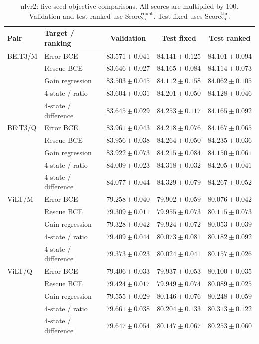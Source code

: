\begin{table}[H]\centering
\caption{nlvr2: five-seed objective comparisons. All scores are multiplied by 100. Validation and test ranked use $\mathrm{Score}_{25}^{\mathrm{count}}$. Test fixed uses $\mathrm{Score}_{25}^{\mathrm{thr}}$.}
\fontsize{7.5}{9}\selectfont
\setlength{\tabcolsep}{3pt}
\begin{tabular}{llccc}\toprule
Pair & Target / ranking & Validation & Test fixed & Test ranked \\\midrule
BEiT3/M & Error BCE & $83.571\pm0.041$ & $84.141\pm0.125$ & $84.101\pm0.094$ \\
 & Rescue BCE & $83.646\pm0.027$ & $84.165\pm0.084$ & $84.114\pm0.073$ \\
 & Gain regression & $83.503\pm0.045$ & $84.112\pm0.158$ & $84.062\pm0.105$ \\
 & 4-state / ratio & $83.604\pm0.031$ & $84.201\pm0.050$ & $84.128\pm0.046$ \\
 & 4-state / difference & $83.645\pm0.029$ & $84.253\pm0.117$ & $84.165\pm0.092$ \\
\addlinespace
BEiT3/Q & Error BCE & $83.961\pm0.043$ & $84.218\pm0.076$ & $84.167\pm0.065$ \\
 & Rescue BCE & $83.956\pm0.038$ & $84.264\pm0.050$ & $84.235\pm0.036$ \\
 & Gain regression & $83.922\pm0.073$ & $84.215\pm0.084$ & $84.150\pm0.061$ \\
 & 4-state / ratio & $84.009\pm0.023$ & $84.318\pm0.032$ & $84.205\pm0.041$ \\
 & 4-state / difference & $84.077\pm0.044$ & $84.329\pm0.079$ & $84.267\pm0.052$ \\
\addlinespace
ViLT/M & Error BCE & $79.258\pm0.040$ & $79.902\pm0.059$ & $80.076\pm0.042$ \\
 & Rescue BCE & $79.309\pm0.011$ & $79.955\pm0.073$ & $80.115\pm0.073$ \\
 & Gain regression & $79.328\pm0.042$ & $79.924\pm0.072$ & $80.053\pm0.039$ \\
 & 4-state / ratio & $79.409\pm0.044$ & $80.073\pm0.081$ & $80.182\pm0.092$ \\
 & 4-state / difference & $79.373\pm0.023$ & $80.024\pm0.041$ & $80.157\pm0.026$ \\
\addlinespace
ViLT/Q & Error BCE & $79.406\pm0.033$ & $79.937\pm0.053$ & $80.100\pm0.035$ \\
 & Rescue BCE & $79.424\pm0.017$ & $79.949\pm0.074$ & $80.089\pm0.025$ \\
 & Gain regression & $79.555\pm0.029$ & $80.146\pm0.076$ & $80.248\pm0.059$ \\
 & 4-state / ratio & $79.661\pm0.038$ & $80.204\pm0.133$ & $80.313\pm0.122$ \\
 & 4-state / difference & $79.647\pm0.054$ & $80.147\pm0.067$ & $80.253\pm0.060$ \\
\addlinespace
\bottomrule\end{tabular}\end{table}
